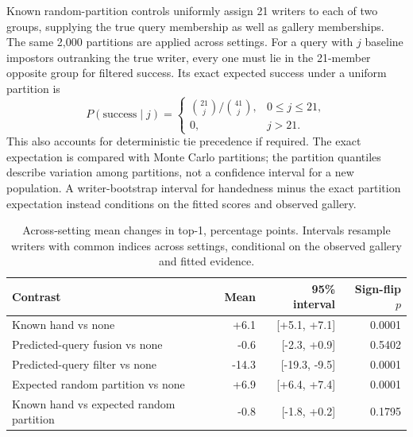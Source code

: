 \documentclass[10pt,a4paper]{article}
\begin{document}
Known random-partition controls uniformly assign 21 writers to each of two groups, supplying the true query membership as well as gallery memberships. The same 2,000 partitions are applied across settings. For a query with $j$ baseline impostors outranking the true writer, every one must lie in the 21-member opposite group for filtered success. Its exact expected success under a uniform partition is
\begin{equation}
 P(\text{success}\mid j)=
 \begin{cases}
 \binom{21}{j}/\binom{41}{j},&0\leq j\leq21,\\
 0,&j>21.
 \end{cases}
\end{equation}
This also accounts for deterministic tie precedence if required. The exact expectation is compared with Monte Carlo partitions; the partition quantiles describe variation among partitions, not a confidence interval for a new population. A writer-bootstrap interval for handedness minus the exact partition expectation instead conditions on the fitted scores and observed gallery.

\begin{table}[ht]
\centering\small
\caption{Across-setting mean changes in top-1, percentage points. Intervals resample writers with common indices across settings, conditional on the observed gallery and fitted evidence.}\label{tab:aggregate}
\begin{tabular}{lrrr}\toprule
Contrast & Mean & 95\% interval & Sign-flip $p$\\\midrule
Known hand vs none & +6.1 & [+5.1, +7.1] & 0.0001 \\
Predicted-query fusion vs none & -0.6 & [-2.3, +0.9] & 0.5402 \\
Predicted-query filter vs none & -14.3 & [-19.3, -9.5] & 0.0001 \\
Expected random partition vs none & +6.9 & [+6.4, +7.4] & 0.0001 \\
Known hand vs expected random partition & -0.8 & [-1.8, +0.2] & 0.1795 \\
\bottomrule

\end{tabular}
\end{table}
\end{document}
